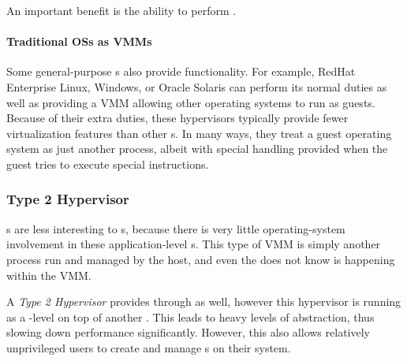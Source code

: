 An important benefit is the ability to perform .

\paragraph{Traditional OSs as VMMs}\label{par:Traditional_OS_VMM}
Some general-purpose s also provide  functionality.
For example, RedHat Enterprise Linux, Windows, or Oracle Solaris can perform its normal duties as well as providing a VMM allowing other operating systems to run as guests.
Because of their extra duties, these hypervisors typically provide fewer virtualization features than other s.
In many ways, they treat a guest operating system as just another process, albeit with special handling provided when the guest tries to execute special instructions.

\subsubsection{Type 2 Hypervisor}\label{subsubsec:Type2_Hypervisor}
s are less interesting to s, because there is very little operating-system involvement in these application-level s.
This type of VMM is simply another process run and managed by the host, and even the  does not know  is happening within the VMM.\@

\begin{definition}\label{def:Type2_Hypervisor}
  A \emph{Type 2 Hypervisor} provides  through  as well, however this hypervisor is running as a -level  on top of another .
  This leads to heavy levels of abstraction, thus slowing down performance significantly.
  However, this also allows relatively unprivileged users to create and manage s on their system.
\end{definition}


